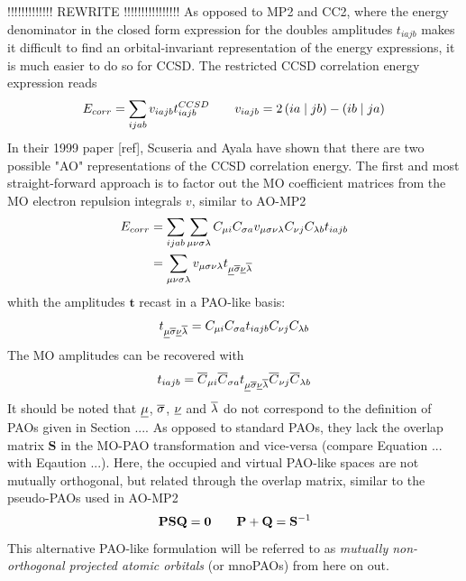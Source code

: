 !!!!!!!!!!!!! REWRITE !!!!!!!!!!!!!!!!
As opposed to MP2 and CC2, where the energy denominator in the closed form expression for the doubles amplitudes $t_{iajb}$ makes it difficult to find an orbital-invariant representation of the energy expressions, it is much easier to do so for CCSD. The restricted CCSD correlation energy expression reads
\begin{equation}
E_{corr} = \sum_{ijab} v_{iajb} t^{CCSD}_{iajb} \qquad v_{iajb} = 2\left( ia \mid jb \right) - \left( ib \mid ja \right) 
\end{equation}   
\noindent In their 1999 paper [ref], Scuseria and Ayala have shown that there are two possible "AO" representations of the CCSD correlation energy. The first and most straight-forward approach is to factor out the MO coefficient matrices from the MO electron repulsion integrals $v$, similar to AO-MP2
\begin{equation}
\begin{split}
E_{corr} &= \sum_{ijab} \sum_{\mu\nu\sigma\lambda} C_{\mu i} C_{\sigma  a} v_{\mu\sigma\nu\lambda} C_{\nu j} C_{\lambda b} t_{iajb} \\
&= \sum_{\mu\nu\sigma\lambda} v_{\mu\sigma\nu\lambda} t_{\underline{\mu}\overline{\sigma}\underline{\nu}\overline{\lambda}}
\end{split} 
\end{equation}
\noindent whith the amplitudes $\mathbf{t}$ recast in a PAO-like basis:
\begin{equation}
t_{\underline{\mu}\overline{\sigma}\underline{\nu}\overline{\lambda}} = C_{\mu i} C_{\sigma a} t_{iajb} C_{\nu j} C_{\lambda b}
\end{equation}
\noindent The MO amplitudes can be recovered with
\begin{equation}
t_{iajb} = \overline{C}_{\mu i} \overline{C}_{\sigma a} t_{\underline{\mu}\overline{\sigma}\underline{\nu}\overline{\lambda}} \overline{C}_{\nu j} \overline{C}_{\lambda b}
\end{equation}
\noindent It should be noted that $\underline{\mu}$, $\overline{\sigma}$, $\underline{\nu}$ and $\overline{\lambda}$ do not correspond to the definition of PAOs given in Section .... As opposed to standard PAOs, they lack the overlap matrix $\mathbf{S}$ in the MO-PAO transformation and vice-versa (compare Equation ... with Eqaution ...). Here, the occupied and virtual PAO-like spaces are not mutually orthogonal, but related through the overlap matrix, similar to the pseudo-PAOs used in AO-MP2
\begin{equation}
\mathbf{PSQ} = \mathbf{0} \qquad \mathbf{P} + \mathbf{Q} = \mathbf{S}^{-1}
\end{equation}
\noindent This alternative PAO-like formulation will be referred to as \emph{mutually non-orthogonal projected atomic orbitals} (or mnoPAOs) from here on out.    


